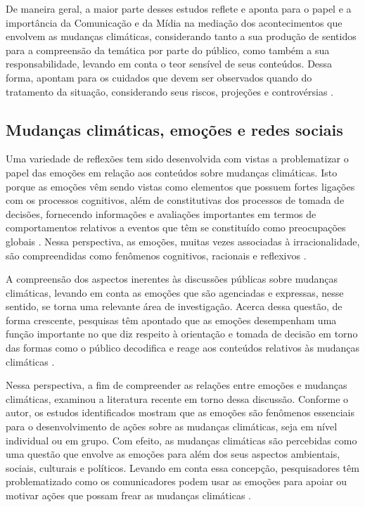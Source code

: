 \documentclass[portuguese]{textolivre}
\begin{document}
De maneira geral, a maior parte desses estudos reflete e aponta para o papel e a importância da Comunicação e da Mídia na mediação dos acontecimentos que envolvem as mudanças climáticas, considerando tanto a sua produção de sentidos para a compreensão da temática por parte do público, como também a sua responsabilidade, levando em conta o teor sensível de seus conteúdos. Dessa forma, apontam para os cuidados que devem ser observados quando do tratamento da situação, considerando seus riscos, projeções e controvérsias \cite{rodas2017midia}.

\subsection{Mudanças climáticas, emoções e redes sociais}\label{sec-conduta}
Uma variedade de reflexões tem sido desenvolvida com vistas a problematizar o papel das emoções em relação aos conteúdos sobre mudanças climáticas. Isto porque as emoções vêm sendo vistas como elementos que possuem fortes ligações com os processos cognitivos, além de constitutivas dos processos de tomada de decisões, fornecendo informações e avaliações importantes em termos de comportamentos relativos a eventos que têm se constituído como preocupações globais \cite{brosch2021affect,roeser2012risk}. Nessa perspectiva, as emoções, muitas vezes associadas à irracionalidade, são compreendidas como fenômenos cognitivos, racionais e reflexivos \cite{lerner2015emotion,brosch2013impact}.

A compreensão dos aspectos inerentes às discussões públicas sobre mudanças climáticas, levando em conta as emoções que são agenciadas e expressas, nesse sentido, se torna uma relevante área de investigação. Acerca dessa questão, de forma crescente, pesquisas têm apontado que as emoções desempenham uma função importante no que diz respeito à orientação e tomada de decisão em torno das formas como o público decodifica e reage aos conteúdos relativos às mudanças climáticas \cite{lu2015incidental,salama2018role}.

Nessa perspectiva, a fim de compreender as relações entre emoções e mudanças climáticas, \textcite{harth2021affect} examinou a literatura recente em torno dessa discussão. Conforme o autor, os estudos identificados mostram que as emoções são fenômenos essenciais para o desenvolvimento de ações sobre as mudanças climáticas, seja em nível individual ou em grupo. Com efeito, as mudanças climáticas são percebidas como uma questão que envolve as emoções para além dos seus aspectos ambientais, sociais, culturais e políticos. Levando em conta essa concepção, pesquisadores têm problematizado como os comunicadores podem usar as emoções para apoiar ou motivar ações que possam frear as mudanças climáticas \cite{salama2018role,roeser2012risk,brosch2021affect}.
\end{document}
